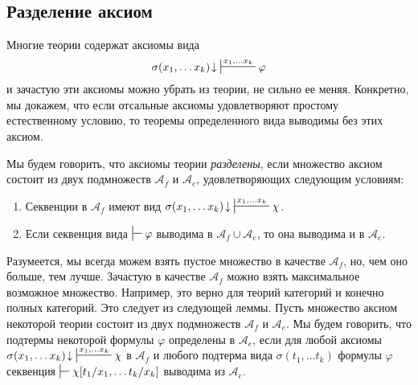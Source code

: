 \documentclass[reqno]{amsart}
\theoremstyle{definition}
\theoremstyle{remark}
\begin{document}
\subsection{Разделение аксиом}

Многие теории содержат аксиомы вида
\[ \sigma(x_1, \ldots x_k)\!\downarrow\ \sststile{}{x_1, \ldots x_k} \varphi \]
и зачастую эти аксиомы можно убрать из теории, не сильно ее меняя.
Конкретно, мы докажем, что если отсальные аксиомы удовлетворяют простому естественному условию, то теоремы определенного вида выводимы без этих аксиом.

Мы будем говорить, что аксиомы теории \emph{разделены}, если множество аксиом состоит из двух подмножеств $\mathcal{A}_f$ и $\mathcal{A}_e$, удовлетворяющих следующим условиям:
\begin{enumerate}
\item \label{it:sep-f} Секвенции в $\mathcal{A}_f$ имеют вид $\sigma(x_1, \ldots x_k)\!\downarrow\ \sststile{}{x_1, \ldots x_k} \chi$.
\item \label{it:sep-e} Если секвенция вида $\sststile{}{} \varphi$ выводима в $\mathcal{A}_f \cup \mathcal{A}_e$, то она выводима и в $\mathcal{A}_e$.
\end{enumerate}

Разумеется, мы всегда можем взять пустое множество в качестве $\mathcal{A}_f$, но, чем оно больше, тем лучше.
Зачастую в качестве $\mathcal{A}_f$ можно взять максимальное возможное множество.
Например, это верно для теорий категорий и конечно полных категорий.
Это следует из следующей леммы.
Пусть множество аксиом некоторой теории состоит из двух подмножеств $\mathcal{A}_f$ и $\mathcal{A}_e$.
Мы будем говорить, что подтермы некоторой формулы $\varphi$ определены в $\mathcal{A}_e$, если для любой аксиомы $\sigma(x_1, \ldots x_k)\!\downarrow\ \sststile{}{x_1, \ldots x_k} \chi$ в $\mathcal{A}_f$
и любого подтерма вида $\sigma(t_1, \ldots t_k)$ формулы $\varphi$ секвенция $\sststile{}{} \chi[t_1/x_1, \ldots t_k/x_k]$ выводима из $\mathcal{A}_e$.
\end{document}
